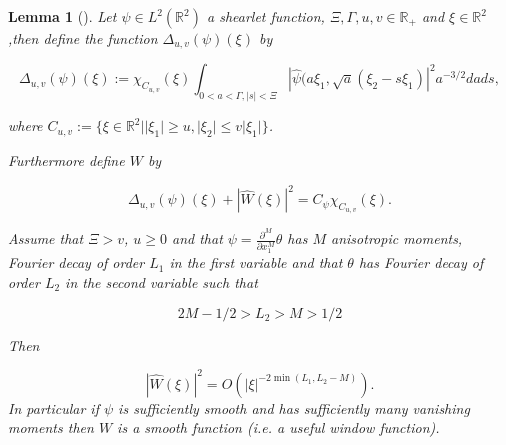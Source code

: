 \documentclass[a4paper]{article}
\newtheorem{lemma}{Lemma}
\begin{document}
\bigskip


\begin{lemma}[\cite{WaveFrontSetGrohs}]
\label{lem:lemmaGrohs}
Let $\psi \in L^2(\mathbb{R}^2)$ a shearlet function, $\Xi, \Gamma,u,v\in \mathbb{R}_+$ and $\xi\in\mathbb{R}^2$,then define the function $\Delta_{u,v}(\psi)(\xi)$ by

$$
\Delta_{u,v}(\psi)(\xi):=\chi_{C_{u,v}}(\xi)\int_{0<a<\Gamma, |s|<\Xi}|\hat{\psi}(a\xi_1,\sqrt{a}(\xi_2-s\xi_1)|^2a^{-3/2}dads,
$$

where $C_{u,v}:=\{\xi\in \mathbb{R}^2 | |\xi_1|\geq u, |\xi_2|\leq v|\xi_1|\}$.

Furthermore define $W$ by 

$$
\Delta_{u,v}(\psi)(\xi)+|\hat{W}(\xi)|^2=C_{\psi}\chi_{C_{u,v}}(\xi).
$$

Assume that $\Xi>v$, $u\geq 0$ and that $\psi = \frac{\partial^M}{\partial x_1^M}\theta$ has $M$ anisotropic moments, Fourier decay of order $L_1$ in the first variable and that $\theta$ has Fourier decay of order $L_2$ in the second variable such that

$$
2M-1/2>L_2>M>1/2
$$

Then

$$
|\hat{W}(\xi)|^2= O(|\xi|^{-2\min (L_1,L_2-M)}).
$$
In particular if $\psi$ is sufficiently smooth and has sufficiently many vanishing moments then $W$ is a smooth function (i.e. a useful window function).
\end{lemma}

\bigskip
\end{document}
